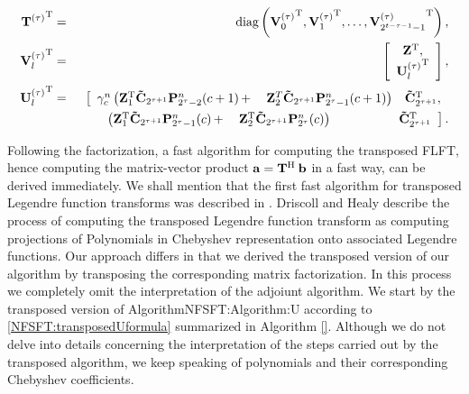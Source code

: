 \begin{eqnarray}
  \nonumber
  {\V{T}^{(\tau)}}^{\transp}   & = & \text{diag}\left({\V{V}^{(\tau)}_0}^{\transp},{\V{V}^{(\tau)}_1}^{\transp},
  \dots,{\V{V}^{(\tau)}_{2^{t-\tau-1}-1}}^{\transp}\right),\\
  \nonumber
  {\V{V}^{(\tau)}_l}^{\transp} & = & \left[ \begin{array}{c} \V{Z}^{\transp},\\ 
  \nonumber
  {\V{U}^{(\tau)}_l}^{\transp} \end{array} \right],\\
  \nonumber
  {\V{U}^{(\tau)}_l}^{\transp} & = &
  \left[
    \begin{array}{rrl}
      \gamma_{c}^n \left( \V{Z}_{1}^{\transp} \V{\tilde{C}}_{2^{\tau+1}} \fun{\V{P}_{2^{\tau}-2}^n}{c+1} + \right. & 
                   \left. \V{Z}_{2}^T         \V{\tilde{C}}_{2^{\tau+1}} \fun{\V{P}_{2^{\tau}-1}^n}{c+1}   \right) &
                   \V{\tilde{C}}_{2^{\tau+1}}^{\transp},
    \end{array}               
   \right.\\
  \nonumber
   & &
   \left.
     \begin{array}{rrl}
       \hspace*{3.8ex} \left( \V{Z}_{1}^{\transp} \V{\tilde{C}}_{2^{\tau+1}} \fun{\V{P}_{2^{\tau}-1}^n}{c} + \right. &
                                \left. \V{Z}_{2}^{\transp} \V{\tilde{C}}_{2^{\tau+1}} \fun{\V{P}_{2^{\tau}}^n}{c}     \right) &
                                \hspace*{10.4ex} \V{\tilde{C}}_{2^{\tau+1}}^{\transp}
       \end{array}
   \right].
\end{eqnarray}

Following the factorization, a fast algorithm for computing the transposed FLFT, hence computing the matrix-vector 
product $\mathbf{a} = \mathbf{T}^{\text{\rm{H}}} \: \mathbf{b}$ in a fast way, can be derived immediately. We shall mention that the first fast 
algorithm for transposed Legendre function transforms was described in \cite{drhe}. Driscoll and Healy describe the process of 
computing the transposed Legendre function transform as computing projections of Polynomials in Chebyshev representation onto 
associated Legendre functions. Our approach differs in that we derived the transposed version of our algorithm by transposing the corresponding matrix factorization. In this process we completely omit the interpretation of the adjoiunt algorithm. We start by the transposed version of Algorithm{NFSFT:Algorithm:U} according to \eqref{NFSFT:transposedUformula} summarized in Algorithm \ref{}. 
Although we do not delve into details concerning the interpretation of the steps carried out by the transposed algorithm, we keep 
speaking of polynomials and their corresponding Chebyshev coefficients.

